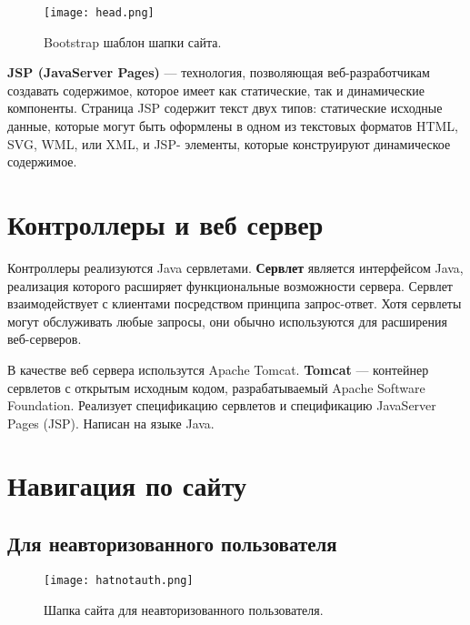 \begin{figure}[h]
  \centering
  \texttt{[image: head.png]}
  \caption{Bootstrap шаблон шапки сайта.}
\end{figure}

\textbf{JSP (JavaServer Pages)} — технология, позволяющая веб-разработчикам создавать содержимое, которое имеет как статические, так и динамические компоненты. Страница JSP содержит текст двух типов: статические исходные данные, которые могут быть оформлены в одном из текстовых форматов HTML, SVG, WML, или XML, и JSP- элементы, которые конструируют динамическое содержимое.

 


\section{Контроллеры и веб сервер}

Контроллеры реализуются Java сервлетами. \textbf{Сервлет} является интерфейсом Java, реализация которого расширяет функциональные возможности сервера. Сервлет взаимодействует с клиентами посредством принципа запрос-ответ. Хотя сервлеты могут обслуживать любые запросы, они обычно используются для расширения веб-серверов.

В качестве веб сервера использутся Apache Tomcat. \textbf{Tomcat} — контейнер сервлетов с открытым исходным кодом, разрабатываемый Apache Software Foundation. Реализует спецификацию сервлетов и спецификацию JavaServer Pages (JSP). Написан на языке Java.



\section{Навигация по сайту} 

\subsection{Для неавторизованного пользователя} 

\begin{figure}[h]
  \centering
  \texttt{[image: hatnotauth.png]}
  \caption{ Шапка сайта для неавторизованного пользователя.}
\end{figure}

